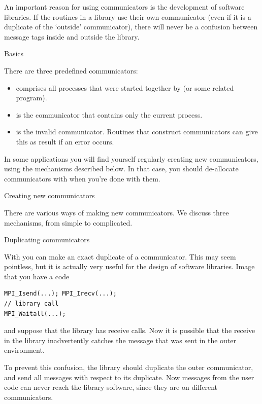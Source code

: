 An important reason for using communicators is the development of
software libraries. If the routines in a library use their own communicator
(even if it is a duplicate of the `outside' communicator), there
will never be a confusion between message tags inside and outside the 
library.

 {Basics}

There are three predefined communicators:
\begin{itemize}
\item {} comprises all processes that were started 
  together by  (or some related program).
\item {} is the communicator that contains only
   the current process.
\item {} is the invalid communicator. Routines
  that construct communicators can give this as result if an error occurs.
\end{itemize}

In some applications you will find yourself regularly creating new
communicators, using the mechanisms described below. In that case, you
should de-allocate communicators with  when
you're done with them.

 {Creating new communicators}

There are various ways of making new communicators. We discuss three 
mechanisms, from simple to complicated.

 {Duplicating communicators}

With  you can make an exact duplicate of a communicator.
This may seem pointless, but it is actually very useful for the design of
software libraries. Image that you have a code
\begin{verbatim}
MPI_Isend(...); MPI_Irecv(...);
// library call
MPI_Waitall(...);
\end{verbatim}
and suppose that the library has receive calls. Now it is possible that the 
receive in the library inadvertently
catches the message that was sent in the outer environment.

To prevent this confusion, the library should duplicate the outer communicator,
and send all messages with respect to its duplicate. Now messages from the user
code can never reach the library software, since they are on different communicators.

